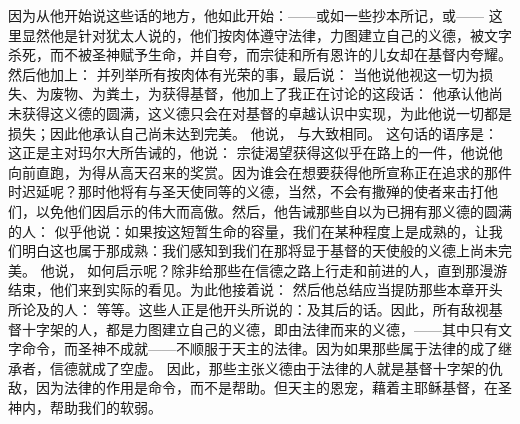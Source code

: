因为从他开始说这些话的地方，他如此开始：——或如一些抄本所记，或—— 这里显然他是针对犹太人说的，他们按肉体遵守法律，力图建立自己的义德，被文字杀死，而不被圣神赋予生命，并自夸，而宗徒和所有恩许的儿女却在基督内夸耀。然后他加上： 并列举所有按肉体有光荣的事，最后说： 当他说他视这一切为损失、为废物、为粪土，为获得基督，他加上了我正在讨论的这段话： 他承认他尚未获得这义德的圆满，这义德只会在对基督的卓越认识中实现，为此他说一切都是损失；因此他承认自己尚未达到完美。 他说， 与大致相同。  这句话的语序是： 这正是主对玛尔大所告诫的，他说： 宗徒渴望获得这似乎在路上的一件，他说他向前直跑，为得从高天召来的奖赏。因为谁会在想要获得他所宣称正在追求的那件时迟延呢？那时他将有与圣天使同等的义德，当然，不会有撒殚的使者来击打他们，以免他们因启示的伟大而高傲。然后，他告诫那些自以为已拥有那义德的圆满的人： 似乎他说：如果按这短暂生命的容量，我们在某种程度上是成熟的，让我们明白这也属于那成熟：我们感知到我们在那将显于基督的天使般的义德上尚未完美。 他说， 如何启示呢？除非给那些在信德之路上行走和前进的人，直到那漫游结束，他们来到实际的看见。为此他接着说： 然后他总结应当提防那些本章开头所论及的人： 等等。这些人正是他开头所说的：及其后的话。因此，所有敌视基督十字架的人，都是力图建立自己的义德，即由法律而来的义德，——其中只有文字命令，而圣神不成就——不顺服于天主的法律。因为如果那些属于法律的成了继承者，信德就成了空虚。 因此，那些主张义德由于法律的人就是基督十字架的仇敌，因为法律的作用是命令，而不是帮助。但天主的恩宠，藉着主耶稣基督，在圣神内，帮助我们的软弱。\par

